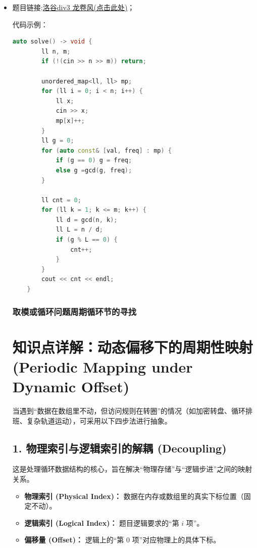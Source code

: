 \begin{itemize}
\subsection*{4. 最终判定结论：}
若使环形数组满足连续 $k$ 项和相等，当且仅当：
\[
\frac{n}{\gcd(n, k)} \Bigm| \gcd(c_1, c_2, \dots, c_m)
\]
\item 题目链接:\href{https://www.luogu.com.cn/problem/T618226?contestId=273960}{洛谷div3 龙卷风(点击此处)}；

代码示例：\\
\begin{lstlisting}[language=C++]
	auto solve() -> void {
		ll n, m;
		if (!(cin >> n >> m)) return;
		
		unordered_map<ll, ll> mp;
		for (ll i = 0; i < n; i++) {
			ll x;
			cin >> x;
			mp[x]++;
		}
		ll g = 0;
		for (auto const& [val, freq] : mp) {
			if (g == 0) g = freq;
			else g =gcd(g, freq);
		}
		
		ll cnt = 0;
		for (ll k = 1; k <= m; k++) {
			ll d = gcd(n, k);
			ll L = n / d;
			if (g % L == 0) {
				cnt++;
			}
		}
		cout << cnt << endl;
	}
\end{lstlisting}
\subsubsection{取模或循环问题周期循环节的寻找}
\section*{知识点详解：动态偏移下的周期性映射 (Periodic Mapping under Dynamic Offset)}

\begin{tcolorbox}[colback=blue!5!white, colframe=blue!75!black, title=核心逻辑]
	当遇到“数据在数组里不动，但访问规则在转圈”的情况（如加密转盘、循环排班、复杂轨道运动），可采用以下四步法进行抽象。
\end{tcolorbox}

\subsection*{1. 物理索引与逻辑索引的解耦 (Decoupling)}
这是处理循环数据结构的核心，旨在解决“物理存储”与“逻辑步进”之间的映射关系。
\begin{itemize}
	\item \textbf{物理索引 (Physical Index)：} 数据在内存或数组里的真实下标位置（固定不动）。
	\item \textbf{逻辑索引 (Logical Index)：} 题目逻辑要求的“第 $i$ 项”。
	\item \textbf{偏移量 (Offset)：} 逻辑上的“第 $0$ 项”对应物理上的具体下标。
\end{itemize}


\end{itemize}
